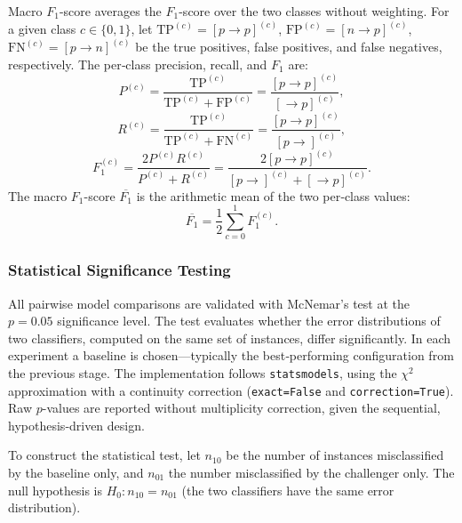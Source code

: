 \documentclass[a4paper,fleqn]{cas-dc}
\newcommand{\precision}{P}
\newcommand{\recall}{R}
\newcommand{\FOne}{F_1}
\newcommand{\MacroFOne}{\overline{\FOne}}
\newcommand{\positiveclass}{p}
\newcommand{\negativeclass}{n}
\newcommand{\ksTP}{[\positiveclass \to \positiveclass]}
\newcommand{\ksFP}{[\negativeclass \to \positiveclass]}
\newcommand{\ksFN}{[\positiveclass \to \negativeclass]}
\newcommand{\ksOriginalPositive}{[\positiveclass\to]}
\newcommand{\ksPredictedPositive}{[\to\positiveclass]}
\newcommand{\TP}{\mathrm{TP}}
\newcommand{\FP}{\mathrm{FP}}
\newcommand{\FN}{\mathrm{FN}}
\newcommand{\code}[1]{\texttt{#1}}
\newcommand{\instanceClass}{c}
\newcommand{\insclass}{^{(\instanceClass)}}
\newcommand{\mcnemarp}{p}
\newcommand{\missclassified}[1]{n_{#1}}
\newcommand{\nullhypo}{H_0}
\begin{document}
Macro $\FOne$-score averages the $\FOne$-score over the two classes without weighting.
For a given class $\instanceClass \in \{0,1\}$, let $\TP\insclass = \ksTP\insclass$, $\FP\insclass = \ksFP\insclass$, $\FN\insclass = \ksFN\insclass$ be the true positives, false positives, and false negatives, respectively.
The per‑class precision, recall, and $F_1$ are:
\begin{equation}	
   \precision\insclass = 	\frac{\text{TP}\insclass}{\text{TP}\insclass + \text{FP}\insclass} = \frac{\ksTP\insclass}{\ksPredictedPositive\insclass},
\end{equation}
%
\begin{equation}
   \recall\insclass = \frac{\text{TP}\insclass}{\text{TP}\insclass + \text{FN}\insclass} = \frac{\ksTP\insclass}{\ksOriginalPositive\insclass},
\end{equation}
%
\begin{equation}
   \FOne\insclass = \frac{2P\insclass  R\insclass}{P\insclass + R\insclass} =  \frac{2\ksTP\insclass}{\ksOriginalPositive\insclass + \ksPredictedPositive\insclass}.
\end{equation}
%
The macro $\FOne$-score $\MacroFOne$ is the arithmetic mean of the two per‑class values:
\begin{equation}
	\MacroFOne = \frac{1}{2} \sum_{\instanceClass=0}^{1} \FOne\insclass.
	\label{eq:macro:f1}
\end{equation}

\subsubsection{Statistical Significance Testing}

All pairwise model comparisons are validated with McNemar’s test at the $\mcnemarp = 0.05$ significance level.
The test evaluates whether the error distributions of two classifiers, computed on the same set of instances, differ significantly.
In each experiment a baseline is chosen---typically the best‑performing configuration from the previous stage.
The implementation follows \texttt{statsmodels}, using the $\chi^2$ approximation with a continuity correction (\code{exact=False} and \code{correction=True}).
Raw $\mcnemarp$-values are reported without multiplicity correction, given the sequential, hypothesis‑driven design.

To construct the statistical test, let $\missclassified{10}$ be the number of instances misclassified by the baseline only, and $\missclassified{01}$ the number misclassified by the challenger only.
The null hypothesis is $\nullhypo: \missclassified{10} = \missclassified{01}$ (the two classifiers have the same error distribution). 
\end{document}
